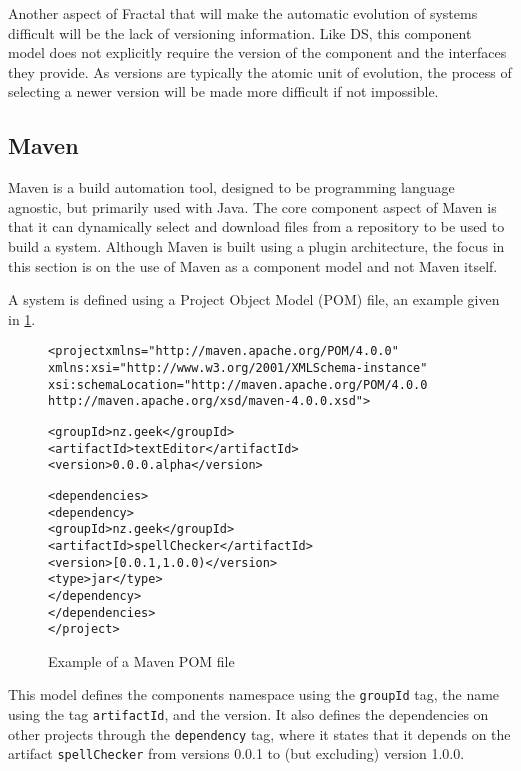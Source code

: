 Another aspect of Fractal that will make the automatic evolution of systems difficult will be the lack of versioning information.
Like DS, this component model does not explicitly require the version of the component and the interfaces they provide.
As versions are typically the atomic unit of evolution, the process of selecting a newer version will be made more difficult if not impossible. 

\subsection{Maven}
Maven is a build automation tool, designed to be programming language agnostic, but primarily used with Java.
The core component aspect of Maven is that it can dynamically select and download files from a repository to be used to build a system.
Although Maven is built using a plugin architecture, the focus in this section is on the use of Maven as a component model and not Maven itself.

A system is defined using a Project Object Model (POM) file, an example given in \ref{mavenmetadata}. 

\begin{figure}[htp]
\begin{center}
\begin{alltt}
<project xmlns="http://maven.apache.org/POM/4.0.0"
  xmlns:xsi="http://www.w3.org/2001/XMLSchema-instance"
  xsi:schemaLocation="http://maven.apache.org/POM/4.0.0
                      http://maven.apache.org/xsd/maven-4.0.0.xsd">

  <groupId>nz.geek</groupId>
  <artifactId>textEditor</artifactId>
  <version>0.0.0.alpha</version>

  <dependencies>
    <dependency>
      <groupId>nz.geek</groupId>
      <artifactId>spellChecker</artifactId>
      <version>[0.0.1,1.0.0)</version>
      <type>jar</type>
     </dependency>
  </dependencies>
</project>
\end{alltt}
  \caption[Maven POM file]{Example of a Maven POM file}
  \label{mavenmetadata}
\end{center}
\end{figure}

This model defines the components namespace using the \texttt{groupId} tag, the name using the tag \texttt{artifactId}, and the version.
It also defines the dependencies on other projects through the \texttt{dependency} tag,
where it states that it depends on the artifact \texttt{spellChecker} from versions 0.0.1 to (but excluding) version 1.0.0.

